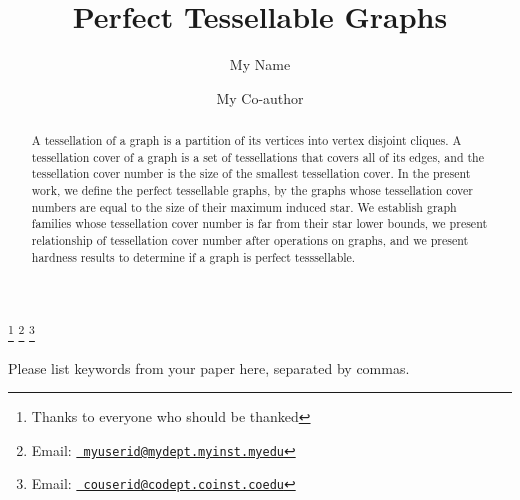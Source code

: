 \documentclass[9pt]{entcs} \usepackage{entcsmacro}
\begin{document}
\begin{frontmatter}
  \title{Perfect Tessellable Graphs} \author{My
    Name}
  \address{My Department\\ My University\\
    My City, My Country} \author{My Co-author}
  \address{My Co-author's Department\\My Co-author's University\\
    My Co-author's City, My Co-author's Country} \thanks[ALL]{Thanks
    to everyone who should be thanked} \thanks[myemail]{Email:
    \href{mailto:myuserid@mydept.myinst.myedu} {\texttt{\normalshape
        myuserid@mydept.myinst.myedu}}} \thanks[coemail]{Email:
    \href{mailto:couserid@codept.coinst.coedu} {\texttt{\normalshape
        couserid@codept.coinst.coedu}}}

\begin{abstract} 
  A tessellation of a graph is a partition of its vertices into vertex disjoint cliques. A tessellation cover of a graph is a set of tessellations that covers all of its edges, and the tessellation cover number is the size of the smallest tessellation cover. 
  In the present work, we define the perfect tessellable graphs, by the graphs whose tessellation cover numbers are equal to 
  the size of
  their maximum induced star.
  We establish graph families whose tessellation cover number is far from their star lower bounds, we present relationship of tessellation cover number after operations on graphs, and we present hardness results to determine if a graph is perfect tesssellable.
  
\end{abstract}
\begin{keyword}
  Please list keywords from your paper here, separated by commas.
\end{keyword}
\end{frontmatter}
\end{document}
